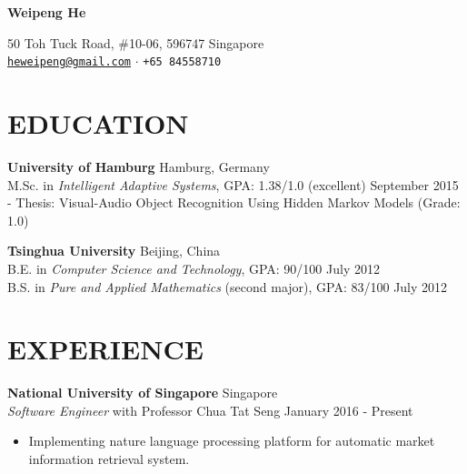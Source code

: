 \documentclass[a4paper,11pt]{article} %
\newcommand{\ind}{\hspace*{1em}}
\begin{document}
\thispagestyle{empty}


\begin{center}
  {\Huge\bfseries Weipeng He}

  50 Toh Tuck Road, \#10-06, 596747 Singapore \\
  \href{mailto:heweipeng@gmail.com}{\texttt{heweipeng@gmail.com}} $\cdotp$
  \texttt{+65 84558710}
\end{center}


\section{EDUCATION}
\textbf{University of Hamburg} \hfill Hamburg, Germany \\
\ind M.Sc. in \textit{Intelligent Adaptive Systems}, GPA: 1.38/1.0 (excellent)  \hfill September 2015 \\
\ind - Thesis: Visual-Audio Object Recognition Using Hidden Markov Models (Grade: 1.0)

\textbf{Tsinghua University} \hfill Beijing, China \\
\ind B.E. in \textit{Computer Science and Technology}, GPA: 90/100 \hfill July 2012 \\
\ind B.S. in \textit{Pure and Applied Mathematics} (second major), GPA: 83/100 \hfill July 2012


\section{EXPERIENCE}

\textbf{National University of Singapore}  \hfill Singapore \\
\textit{Software Engineer} with Professor Chua Tat Seng \hfill January 2016 - Present
\vspace{-\parskip}
\begin{itemize}
  \item Implementing nature language processing platform for automatic market information retrieval system.
\end{itemize}
\end{document}
